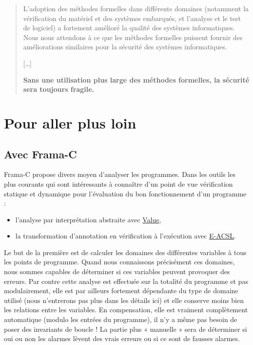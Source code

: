 \documentclass[12pt,francais,]{scrbook}
\providecommand{\tightlist}{%
  \setlength{\itemsep}{0pt}\setlength{\parskip}{0pt}}
\newenvironment{zdssecretblock}[1]{%
  \tcolorbox[beamer,%
    noparskip,breakable,
    colback=LightGray,colframe=DarkGray,%
    colbacklower=LightGray,%
    title=#1]
}{\endtcolorbox}
\begin{document}
\begin{zdssecretblock}{Traduction}
  \begin{quote}
    L'adoption des méthodes formelles dans différents domaines (notamment la
    vérification du matériel et des systèmes embarqués, et l'analyse et le
    test de logiciel) a fortement amélioré la qualité des systèmes
    informatiques. Nous nous attendons à ce que les méthodes formelles
    puissent fournir des améliorations similaires pour la sécurité des
    systèmes informatiques.
    
    {[}\ldots{}{]}
    
    \textbf{Sans une utilisation plus large des méthodes formelles, la
      sécurité sera toujours fragile.}
  \end{quote}
\end{zdssecretblock}

\chapter{Pour aller plus loin}\label{pour-aller-plus-loin}

\section{Avec Frama-C}\label{avec-frama-c}

Frama-C propose divers moyen d'analyser les programmes. Dans les outils
les plus courants qui sont intéressants à connaître d'un point de vue
vérification statique et dynamique pour l'évaluation du bon
fonctionnement d'un programme :

\begin{itemize}
\tightlist
\item
  l'analyse par interprétation abstraite avec
  \href{http://frama-c.com/value.html}{Value},
\item
  la transformation d'annotation en vérification à l'exécution avec
  \href{http://frama-c.com/eacsl.html}{E-ACSL}.
\end{itemize}

Le but de la première est de calculer les domaines des différentes
variables à tous les points de programme. Quand nous connaissons
précisément ces domaines, nous sommes capables de déterminer si ces
variables peuvent provoquer des erreurs. Par contre cette analyse est
effectuée sur la totalité du programme et pas modulairement, elle est
par ailleurs fortement dépendante du type de domaine utilisé (nous
n'entrerons pas plus dans les détails ici) et elle conserve moins bien
les relations entre les variables. En compensation, elle est vraiment
complètement automatique (modulo les entrées du programme), il n'y a
même pas besoin de poser des invariants de boucle ! La partie plus «
manuelle » sera de déterminer si oui ou non les alarmes lèvent des vrais
erreurs ou si ce sont de fausses alarmes.
\end{document}
